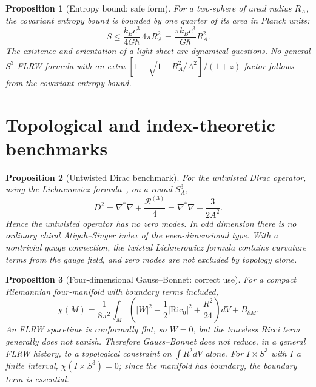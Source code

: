 \documentclass[
  aps,
  prd,
  reprint,
  superscriptaddress,
  nofootinbib,
  floatfix,
  longbibliography
]{revtex4-2}
\newtheorem{proposition}{Proposition}
\begin{document}
\begin{proposition}[Entropy bound: safe form]
\label{prop:entropy}
For a two-sphere of areal radius \(R_A\), the covariant entropy bound is bounded
by one quarter of its area in Planck units:
\begin{equation}
  S\le \frac{k_Bc^3}{4G\hbar}\,4\pi R_A^2
  =\frac{\pi k_Bc^3}{G\hbar}R_A^2 .
  \label{eq:entropy}
\end{equation}
The existence and orientation of a light-sheet are dynamical questions.  No
general \(S^3\) FLRW formula with an extra
\([1-\sqrt{1-R_A^2/A^2}]/(1+z)\) factor follows from the covariant entropy bound.
\end{proposition}

\section{Topological and index-theoretic benchmarks}
\label{sec:top}

\begin{proposition}[Untwisted Dirac benchmark]
\label{prop:dirac}
For the untwisted Dirac operator, using the Lichnerowicz formula~\cite{Lichnerowicz1958}, on a round \(S_A^3\),
\begin{equation}
  D^2=\nabla^*\nabla+\frac{\mathcal R^{(3)}}{4}
  =\nabla^*\nabla+\frac{3}{2A^2}.
\end{equation}
Hence the untwisted operator has no zero modes.  In odd dimension there is no
ordinary chiral Atiyah--Singer index of the even-dimensional type.  With a
nontrivial gauge connection, the twisted Lichnerowicz formula contains curvature
terms from the gauge field, and zero modes are not excluded by topology alone.
\end{proposition}

\begin{proposition}[Four-dimensional Gauss--Bonnet: correct use]
\label{prop:GB}
For a compact Riemannian four-manifold with boundary terms included,
\begin{equation}
  \chi(M)=\frac{1}{8\pi^2}\int_M
  \left(
  |W|^2-\frac12|\mathrm{Ric}_0|^2+\frac{R^2}{24}
  \right)dV
  +B_{\partial M}.
  \label{eq:GB}
\end{equation}
An FLRW spacetime is conformally flat, so \(W=0\), but the traceless Ricci term
generally does not vanish.  Therefore Gauss--Bonnet does not reduce, in a general
FLRW history, to a topological constraint on \(\int R^2dV\) alone.  For
\(I\times S^3\) with \(I\) a finite interval, \(\chi(I\times S^3)=0\); since the
manifold has boundary, the boundary term is essential.
\end{proposition}
\end{document}
